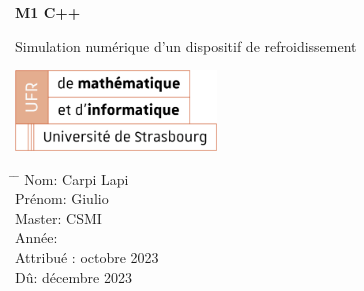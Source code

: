 \documentclass[12pt,a4paper]{article}
\title{}
\author{}
\date{}
\begin{document}
	
	\newcommand{\subf}[2]{%
		{\small\begin{tabular}[t]{@{}c@{}}
				#1\\#2
		\end{tabular}}%
	}
	
	\begin{titlepage}
		\begin{center}
			\vspace*{3cm}
			
			\Huge
			\textbf{M1 C++}
			
			\vspace{0.3cm}
			\Huge
			Simulation numérique d'un dispositif de refroidissement
			
			\vspace{0.8cm}
			\large
			
			
			
			\vspace{0.5cm}
			\LARGE
			
			
			\vspace{1.5cm}
			
			\textbf{}
            \includegraphics[width=0.4\textwidth]{images/logo_ufr.png}
			
			\vfill
			
			
			
			\vspace{0.8cm}
			
			
			
			\Large
			
			
			
			
		\end{center}
		\Large
		\begin{tabbing}
			\hspace*{1em}\= \hspace*{8em} \= \kill %
			\> Nom:\>  Carpi Lapi \\
			\> Prénom:\>  Giulio \\
			\> Master:\>  CSMI  \\
			\> Année:  \> 2023 \\
			\> Attribué :  octobre 2023\\
			\> Dû:  décembre 2023
		\end{tabbing}
		
	\end{titlepage}
	
\end{document}
